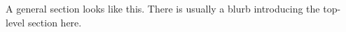 A general section looks like this. There is usually a blurb introducing the top-level section here.

